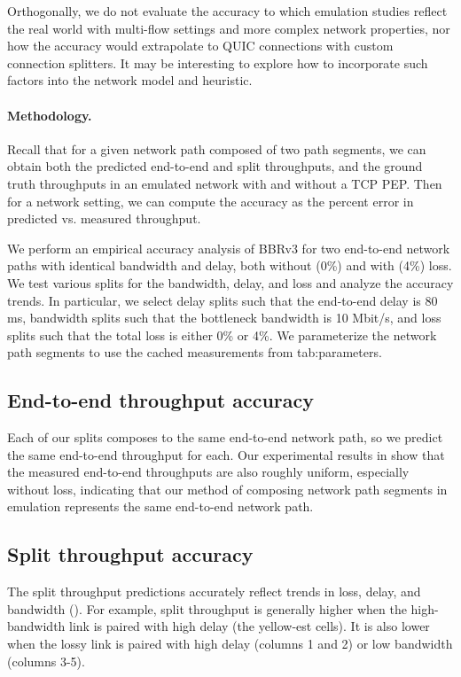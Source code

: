 Orthogonally, we do not evaluate the accuracy to which emulation studies reflect
the real world with multi-flow settings and more complex network properties,
nor how the accuracy would extrapolate to QUIC connections with custom
connection splitters. It may be interesting to explore how to incorporate
such factors into the network model and heuristic.

\paragraph{Methodology.} Recall that for a given network path composed of two
 path segments, we can obtain both the predicted end-to-end and split
 throughputs, and the ground truth throughputs in an emulated network with and
 without a TCP PEP. Then for a network setting, we can compute the accuracy as
 the percent error in predicted vs. measured throughput.

We perform an empirical accuracy analysis of BBRv3 for two end-to-end network paths with
identical bandwidth and delay, both without (0\%) and with (4\%) loss. We test
various splits for the bandwidth, delay, and loss and analyze the accuracy
trends. In particular, we select delay splits such that the end-to-end delay is
80 ms, bandwidth splits such that the bottleneck bandwidth is 10 Mbit/s, and loss
splits such that the total loss is either 0\% or 4\%. We parameterize the network
path segments to use the cached measurements from \Cref
{tab:parameters}.

\subsection{End-to-end throughput accuracy}
\label{sec:splitting:accuracy:e2e}

Each of our splits composes to the same end-to-end network path, so we predict
the same end-to-end throughput for each. Our experimental
results in  show that the measured end-to-end
throughputs are also roughly uniform, especially without loss, indicating that
our method of composing network path segments in emulation represents the same
end-to-end network path.

\subsection{Split throughput accuracy}
\label{sec:splitting:accuracy:split}

The split throughput predictions accurately reflect trends in loss, delay, and
bandwidth (). For example, split throughput is
generally higher when the high-bandwidth link is paired with high delay
(the yellow-est cells). It is also lower when the lossy link is paired with
high delay (columns 1 and 2) or low bandwidth (columns 3-5).

